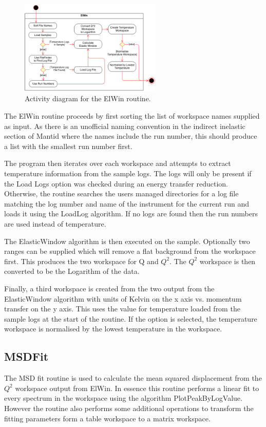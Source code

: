 \documentclass[paper=a4, fontsize=11pt]{scrartcl}	%
\numberwithin{equation}{section}															%
\numberwithin{figure}{section}																%
\numberwithin{table}{section}																%
\begin{document}
\begin{figure}[H]
\centering
\includegraphics[width=0.6\textwidth]{img/uml/activity_diagrams/ElWin_activity.png}
\caption{Activity diagram for the ElWin routine.}
\label{fig:instrument-energy-range}
\end{figure}

The ElWin routine proceeds by first sorting the list of workspace names supplied as input. As there is an unofficial naming convention in the indirect inelastic section of Mantid where the names include the run number, this should produce a list with the smallest run number first.

The program then iterates over each workspace and attempts to extract temperature information from the sample logs. The logs will only be present if the Load Logs option was checked during an energy transfer reduction. Otherwise, the routine searches the users managed directories for a log file matching the log number and name of the instrument for the current run and loads it using the LoadLog algorithm. If no logs are found then the run numbers are used instead of temperature.

The ElasticWindow algorithm is then executed on the sample. Optionally two ranges can be supplied which will remove a flat background from the workspace first. This produces the two workspace for Q and $Q^2$. The $Q^2$ workspace is then converted to be the Logarithm of the data.

Finally, a third workspace is created from the two output from the ElasticWindow algorithm with units of Kelvin on the x axis vs. momentum transfer on the y axis. This uses the value for temperature loaded from the sample logs at the start of the routine. If the option is selected, the temperature workspace is normalised by the lowest temperature in the workspace.

\subsection{MSDFit}
The MSD fit routine is used to calculate the mean squared displacement from the $Q^2$ workspace output from ElWin. In essence this routine performs a linear fit to every spectrum in the workspace using the algorithm PlotPeakByLogValue. However the routine also performs some additional operations to transform the fitting parameters form a table workspace to a matrix workspace.
\end{document}
